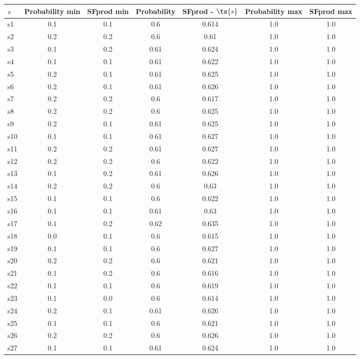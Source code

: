 \documentclass{article}
\begin{document}
\noindent\begin{tabular}{|l|c|c|c|c|c|c|}
\hline
$s$& Probability min & SFprod min & Probability & SFprod - $\ts{s}$ & Probability max & SFprod max\\
\hline
s1 &0.1 & 0.1 & 0.6 & 0.614 & 1.0 & 1.0\\
\hline
s2 &0.2 & 0.2 & 0.6 & 0.61 & 1.0 & 1.0\\
\hline
s3 &0.1 & 0.2 & 0.61 & 0.624 & 1.0 & 1.0\\
\hline
s4 &0.1 & 0.1 & 0.61 & 0.622 & 1.0 & 1.0\\
\hline
s5 &0.2 & 0.1 & 0.61 & 0.625 & 1.0 & 1.0\\
\hline
s6 &0.2 & 0.1 & 0.61 & 0.626 & 1.0 & 1.0\\
\hline
s7 &0.2 & 0.2 & 0.6 & 0.617 & 1.0 & 1.0\\
\hline
s8 &0.2 & 0.2 & 0.6 & 0.625 & 1.0 & 1.0\\
\hline
s9 &0.2 & 0.1 & 0.61 & 0.625 & 1.0 & 1.0\\
\hline
s10 &0.1 & 0.1 & 0.61 & 0.627 & 1.0 & 1.0\\
\hline
s11 &0.2 & 0.2 & 0.61 & 0.627 & 1.0 & 1.0\\
\hline
s12 &0.2 & 0.2 & 0.6 & 0.622 & 1.0 & 1.0\\
\hline
s13 &0.1 & 0.2 & 0.61 & 0.626 & 1.0 & 1.0\\
\hline
s14 &0.2 & 0.2 & 0.6 & 0.63 & 1.0 & 1.0\\
\hline
s15 &0.1 & 0.1 & 0.6 & 0.622 & 1.0 & 1.0\\
\hline
s16 &0.1 & 0.1 & 0.61 & 0.63 & 1.0 & 1.0\\
\hline
s17 &0.1 & 0.2 & 0.62 & 0.635 & 1.0 & 1.0\\
\hline
s18 &0.0 & 0.1 & 0.6 & 0.615 & 1.0 & 1.0\\
\hline
s19 &0.1 & 0.1 & 0.6 & 0.627 & 1.0 & 1.0\\
\hline
s20 &0.2 & 0.2 & 0.6 & 0.621 & 1.0 & 1.0\\
\hline
s21 &0.1 & 0.2 & 0.6 & 0.616 & 1.0 & 1.0\\
\hline
s22 &0.1 & 0.1 & 0.6 & 0.619 & 1.0 & 1.0\\
\hline
s23 &0.1 & 0.0 & 0.6 & 0.614 & 1.0 & 1.0\\
\hline
s24 &0.2 & 0.1 & 0.61 & 0.626 & 1.0 & 1.0\\
\hline
s25 &0.1 & 0.1 & 0.6 & 0.621 & 1.0 & 1.0\\
\hline
s26 &0.2 & 0.2 & 0.6 & 0.626 & 1.0 & 1.0\\
\hline
s27 &0.1 & 0.1 & 0.61 & 0.624 & 1.0 & 1.0\\

\end{tabular}
\end{document}
